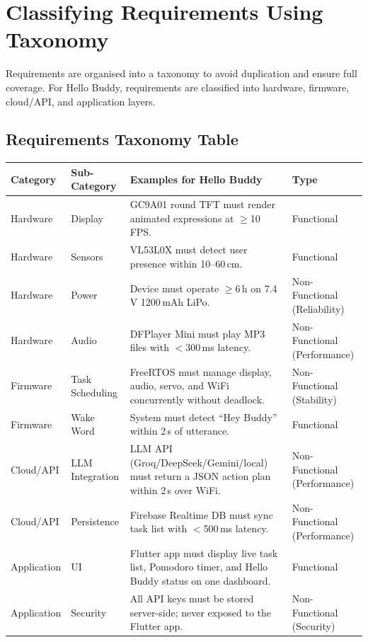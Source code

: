 \documentclass[12pt,a4paper]{article}
\begin{document}
\section*{Classifying Requirements Using Taxonomy}

Requirements are organised into a taxonomy to avoid duplication and ensure full
coverage. For Hello Buddy, requirements are classified into hardware, firmware,
cloud/API, and application layers.

\subsection*{Requirements Taxonomy Table}

\begin{center}
\small
\begin{tabular}{|L{0.13\textwidth}|L{0.15\textwidth}|L{0.38\textwidth}|L{0.20\textwidth}|}
\hline
\textbf{Category} & \textbf{Sub-Category} &
\textbf{Examples for Hello Buddy} &
\textbf{Type} \\ \hline
Hardware & Display &
GC9A01 round TFT must render animated expressions at
$\geq$10\,FPS. &
Functional \\ \hline
Hardware & Sensors &
VL53L0X must detect user presence within 10--60\,cm. &
Functional \\ \hline
Hardware & Power &
Device must operate $\geq$6\,h on 7.4\,V 1200\,mAh LiPo. &
Non-Functional (Reliability) \\ \hline
Hardware & Audio &
DFPlayer Mini must play MP3 files with $<$300\,ms latency. &
Non-Functional (Performance) \\ \hline
Firmware & Task Scheduling &
FreeRTOS must manage display, audio, servo, and WiFi
concurrently without deadlock. &
Non-Functional (Stability) \\ \hline
Firmware & Wake Word &
System must detect ``Hey Buddy'' within 2\,s of utterance. &
Functional \\ \hline
Cloud/API & LLM Integration &
LLM API (Groq/DeepSeek/Gemini/local) must return a JSON
action plan within 2\,s over WiFi. &
Non-Functional (Performance) \\ \hline
Cloud/API & Persistence &
Firebase Realtime DB must sync task list with
$<$500\,ms latency. &
Non-Functional (Performance) \\ \hline
Application & UI &
Flutter app must display live task list, Pomodoro timer,
and Hello Buddy status on one dashboard. &
Functional \\ \hline
Application & Security &
All API keys must be stored server-side; never exposed
to the Flutter app. &
Non-Functional (Security) \\ \hline
\end{tabular}
\end{center}
\end{document}
